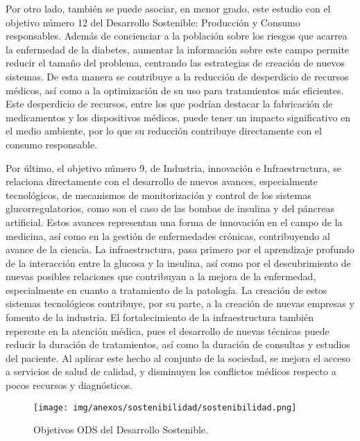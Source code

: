 Por otro lado, también se puede asociar, en menor grado, este estudio con el objetivo número 12 del Desarrollo Sostenible: Producción y Consumo responsables. Además de concienciar a la población sobre los riesgos que acarrea la enfermedad de la diabetes, aumentar la información sobre este campo permite reducir el tamaño del problema, centrando las estrategias de creación de nuevos sistemas. De esta manera se contribuye a la reducción de desperdicio de recursos médicos, así como a la optimización de su uso para tratamientos más eficientes. Este desperdicio de recursos, entre los que podrían destacar la fabricación de medicamentos y los dispositivos médicos, puede tener un impacto significativo en el medio ambiente, por lo que su reducción contribuye directamente con el consumo responsable. 

Por último, el objetivo número 9, de Industria, innovación e Infraestructura, se relaciona directamente con el desarrollo de nuevos avances, especialmente tecnológicos, de mecanismos de monitorización y control de los sistemas glucorregulatorios, como son el caso de las bombas de insulina y del páncreas artificial. Estos avances representan una forma de innovación en el campo de la medicina, así como en la gestión de enfermedades crónicas, contribuyendo al avance de la ciencia. La infraestructura, pasa primero por el aprendizaje profundo de la interacción entre la glucosa y la insulina, así como por el descubrimiento de nuevas posibles relaciones que contribuyan a la mejora de la enfermedad, especialmente en cuanto a tratamiento de la patología. La creación de estos sistemas tecnológicos contribuye, por su parte, a la creación de nuevas empresas y fomento de la industria. El fortalecimiento de la infraestructura también repercute en la atención médica, pues el desarrollo de nuevas técnicas puede reducir la duración de tratamientos, así como la duración de consultas y estudios del paciente. Al aplicar este hecho al conjunto de la sociedad, se mejora el acceso a servicios de salud de calidad, y disminuyen los conflictos médicos respecto a pocos recursos y diagnósticos.

\begin{figure}[htbp]
    \centering
    \texttt{[image: img/anexos/sostenibilidad/sostenibilidad.png]}
    \caption{Objetivos ODS del Desarrollo Sostenible. }
    \label{fig:sost_1}
\end{figure}